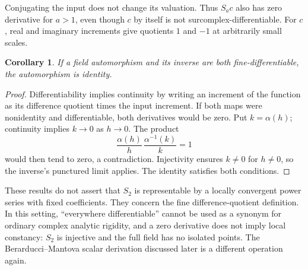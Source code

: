 \documentclass[11pt]{article}
\newtheorem{corollary}[theorem]{Corollary}
\theoremstyle{definition}
\theoremstyle{remark}
\newcommand{\No}{\mathbf{No}}
\newcommand{\repo}[1]{\nolinkurl{#1}}%
\newcommand{\lbl}[1]{\nolinkurl{#1}}%
\numberwithin{equation}{section}
\begin{document}
Conjugating the input does not change its valuation. Thus $S_a c$ also
has zero derivative for $a>1$, even though $c$ by itself is not
surcomplex-differentiable. For $c$, real and imaginary increments give
quotients $1$ and $-1$ at arbitrarily small scales.

\noindent[Added 3 October 2026, batch~84: for the real field $\No$ with its
order topology, the merged report \repo{surreal/surreal-self-embeddings}
decides the derivative of every weighted monomial self-embedding
$\sum_g r_g\omega^g\mapsto\sum_g r_g\chi(g)\omega^{\tau(g)}$, with $\tau$ an
ordered additive embedding of $\No$ and $\chi$ a positive real character, not
only of automorphisms. In exponents of $\omega$: the derivative is zero
everywhere if and only if $\tau(g)-g\to-\infty$ as $g\to-\infty$; the
difference quotient tends to $+\infty$ everywhere if and only if
$\tau(g)-g\to+\infty$; $\chi$ plays no role; and a finite derivative exists
only in the first case or for the identity (its
\lbl{sse:co:thm:derivative-criterion}, from its source~05). For $S_a$, where
$\tau(g)=ag$, this recovers the real case of the theorem above, both for $a>1$
and for $0<a<1$. Its \lbl{sse:co:prop:derivative-rigid} proves the dichotomy of
\cref{saut:thm:derivative} for field self-embeddings of $\No$ by the same
scaling identity. None of its six sources cited this report; the credit is
added there. No result here uses that report.]

\begin{corollary}\label{saut:cor:bidifferentiable}
If a field automorphism and its inverse are both fine-differentiable, the
automorphism is identity.
\end{corollary}
\begin{proof}
Differentiability implies continuity by writing an increment of the
function as its difference quotient times the input increment. If both
maps were nonidentity and differentiable, both derivatives would be zero.
Put $k=\alpha(h)$; continuity implies $k\to0$ as $h\to0$. The product
\[
 \frac{\alpha(h)}h\,
 \frac{\alpha^{-1}(k)}k=1
\]
would then tend to zero, a contradiction. Injectivity ensures $k\ne0$
for $h\ne0$, so the inverse's punctured limit applies. The identity satisfies both
conditions.
\end{proof}

These results do not assert that $S_2$ is representable by a locally
convergent power series with fixed coefficients. They concern the fine
difference-quotient definition. In this setting, ``everywhere
differentiable'' cannot be used as a synonym for ordinary complex analytic
rigidity, and a zero derivative does not imply local constancy: $S_2$ is
injective and the full field has no isolated points. The
Berarducci--Mantova scalar derivation discussed later is a different
operation again.
\end{document}
